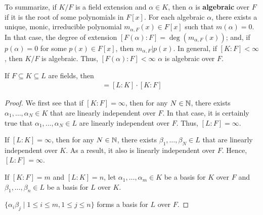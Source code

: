 \documentclass[12pt]{article}
\begin{document}
To summarize, if $K/F$ is a field extension and $\alpha\in K$, then $\alpha$ is \textbf{algebraic} over $F$ if it is the root of some polynomials in $F[x]$. For each algebraic $\alpha$, there exists a unique, monic, irreducible polynomial $m_{\alpha,F}(x)\in F[x]$ such that $m(\alpha)=0$. In that case, the degree of extension $[F(\alpha):F]=\deg(m_{\alpha,F}(x))$; and, if $p(\alpha)=0$ for some $p(x)\in F[x]$, then $m_{\alpha,F}\vert p(x)$. In general, if $[K:F]<\infty$, then $K/F$ is algebraic. Thus, $[F(\alpha):F]<\infty$ \ifnif $\alpha$ is algebraic over $F$.
\begin{proposition} 
    If $F\subseteq K\subseteq L$ are fields, then \begin{align*}
        [L:F]=[L:K]\cdot[K:F]
    \end{align*}
\end{proposition}

\begin{proof}
    We first see that if $[K:F]=\infty$, then for any $N\in \mathbb{N}$, there exists $\alpha_1,\dots,\alpha_N\in K$ that are linearly independent over $F$. In that case, it is certainly true that $\alpha_1,\dots,\alpha_N\in L$ are linearly independent over $F$. Thus, $[L:F]=\infty$. 

    If $[L:K]=\infty$, then for any $N\in \mathbb{N}$, there exists $\beta_1,\dots,\beta_N\in L$ that are linearly independent over $K$. As a result, it also is linearly independent over $F$. Hence, $[L:F]=\infty$.

    If $[K:F]=m$ and $[L:K]=n$, let $\alpha_1,\dots,\alpha_m\in K$ be a basis for $K$ over $F$ and $\beta_1,\dots,\beta_n\in L$ be a basis for $L$ over $K$. 
    
     $\{\alpha_i\beta_j\mid 1\leq i\leq m, 1\leq j\leq n\}$ forms a basis for $L$ over $F$.
\end{proof}
\end{document}
